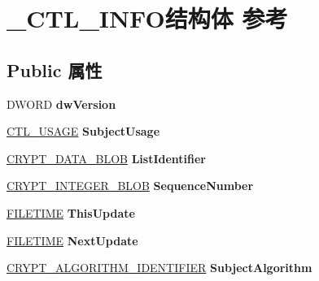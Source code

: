 \hypertarget{struct___c_t_l___i_n_f_o}{}\section{\+\_\+\+C\+T\+L\+\_\+\+I\+N\+F\+O结构体 参考}
\label{struct___c_t_l___i_n_f_o}
\subsection*{Public 属性}
\begin{DoxyCompactItemize}
\item 
\mbox{\label{struct___c_t_l___i_n_f_o_a6bcad8b691af0151b6e30acc264e794b}} 
D\+W\+O\+RD {\bfseries dw\+Version}
\item 
\mbox{\label{struct___c_t_l___i_n_f_o_ac85c6c18574e8af5ffc3e11badc7748c}} 
\hyperlink{struct___c_t_l___u_s_a_g_e}{C\+T\+L\+\_\+\+U\+S\+A\+GE} {\bfseries Subject\+Usage}
\item 
\mbox{\label{struct___c_t_l___i_n_f_o_aa06629389a1b7476c201f98ef30a7f53}} 
\hyperlink{struct___c_r_y_p_t_o_a_p_i___b_l_o_b}{C\+R\+Y\+P\+T\+\_\+\+D\+A\+T\+A\+\_\+\+B\+L\+OB} {\bfseries List\+Identifier}
\item 
\mbox{\label{struct___c_t_l___i_n_f_o_a2255122084a6ba60c23d01a19773737c}} 
\hyperlink{struct___c_r_y_p_t_o_a_p_i___b_l_o_b}{C\+R\+Y\+P\+T\+\_\+\+I\+N\+T\+E\+G\+E\+R\+\_\+\+B\+L\+OB} {\bfseries Sequence\+Number}
\item 
\mbox{\label{struct___c_t_l___i_n_f_o_ac9bb6aef86f12614354693cc2e1491fc}} 
\hyperlink{struct___f_i_l_e_t_i_m_e}{F\+I\+L\+E\+T\+I\+ME} {\bfseries This\+Update}
\item 
\mbox{\label{struct___c_t_l___i_n_f_o_a88708cb75fe62fd120ff8a038b6f2abd}} 
\hyperlink{struct___f_i_l_e_t_i_m_e}{F\+I\+L\+E\+T\+I\+ME} {\bfseries Next\+Update}
\item 
\mbox{\label{struct___c_t_l___i_n_f_o_a7d24b47c7f23cf728e04e5e19498fe36}} 
\hyperlink{struct___c_r_y_p_t___a_l_g_o_r_i_t_h_m___i_d_e_n_t_i_f_i_e_r}{C\+R\+Y\+P\+T\+\_\+\+A\+L\+G\+O\+R\+I\+T\+H\+M\+\_\+\+I\+D\+E\+N\+T\+I\+F\+I\+ER} {\bfseries Subject\+Algorithm}

\end{DoxyCompactItemize}
